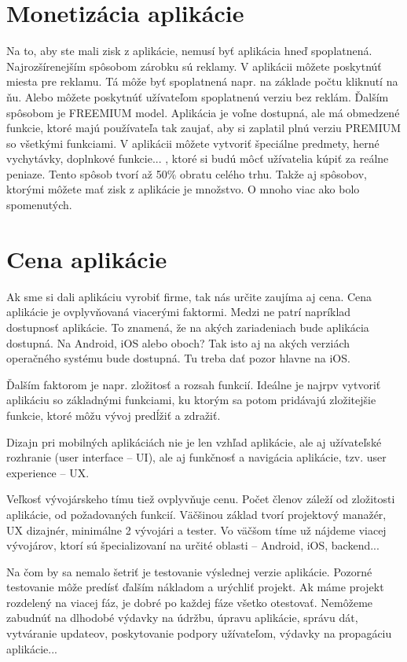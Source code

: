 \documentclass[10pt,twoside,slovak,a4paper]{article}
\begin{document}
\section{Monetizácia aplikácie}
\quad Na to, aby ste mali zisk z aplikácie, nemusí byť aplikácia hneď spoplatnená. Najrozšírenejším spôsobom zárobku sú reklamy. V aplikácii môžete poskytnúť miesta pre reklamu. Tá môže byť spoplatnená napr. na základe počtu kliknutí na ňu. Alebo môžete poskytnúť užívateľom spoplatnenú verziu bez reklám. Ďalším spôsobom je FREEMIUM model. Aplikácia je voľne dostupná, ale má obmedzené funkcie, ktoré majú používateľa tak zaujať, aby si zaplatil plnú verziu PREMIUM so všetkými funkciami. V aplikácii môžete vytvoriť špeciálne predmety, herné vychytávky, doplnkové funkcie... , ktoré si budú môcť užívatelia kúpiť za reálne peniaze. Tento spôsob tvorí až 50\% obratu celého trhu. Takže aj spôsobov, ktorými môžete mať zisk z aplikácie je množstvo. O mnoho viac ako bolo spomenutých.



\section{Cena aplikácie}
\quad Ak sme si dali aplikáciu vyrobiť firme, tak nás určite zaujíma aj cena. Cena aplikácie je ovplyvňovaná viacerými faktormi. Medzi ne patrí napríklad dostupnosť aplikácie. To znamená, že na akých zariadeniach bude aplikácia dostupná. Na Android, iOS alebo oboch? Tak isto aj na akých verziách operačného systému bude dostupná. Tu treba dať pozor hlavne na iOS.

Ďalším faktorom je napr. zložitosť a rozsah funkcií. Ideálne je najrpv vytvoriť aplikáciu so základnými funkciami, ku ktorým sa potom pridávajú zložitejšie funkcie, ktoré môžu vývoj predĺžiť a zdražiť.

Dizajn pri mobilných aplikáciách nie je len vzhľad aplikácie, ale aj užívateľské rozhranie (user interface – UI), ale aj funkčnosť a navigácia aplikácie, tzv. user experience – UX.

Veľkosť vývojárskeho tímu tiež ovplyvňuje cenu. Počet členov záleží od zložitosti aplikácie, od požadovaných funkcií. Väčšinou základ tvorí projektový manažér, UX dizajnér, minimálne 2 vývojári a tester. Vo väčšom tíme už nájdeme viacej vývojárov, ktorí sú špecializovaní na určité oblasti – Android, iOS, backend...

Na čom by sa nemalo šetriť je testovanie výslednej verzie aplikácie. Pozorné testovanie môže predísť ďalším nákladom a urýchliť projekt. Ak máme projekt rozdelený na viacej fáz, je dobré po každej fáze všetko otestovať.
Nemôžeme zabudnúť na dlhodobé výdavky na údržbu, úpravu aplikácie, správu dát, vytváranie updateov, poskytovanie podpory užívateľom, výdavky na propagáciu aplikácie...
\end{document}
